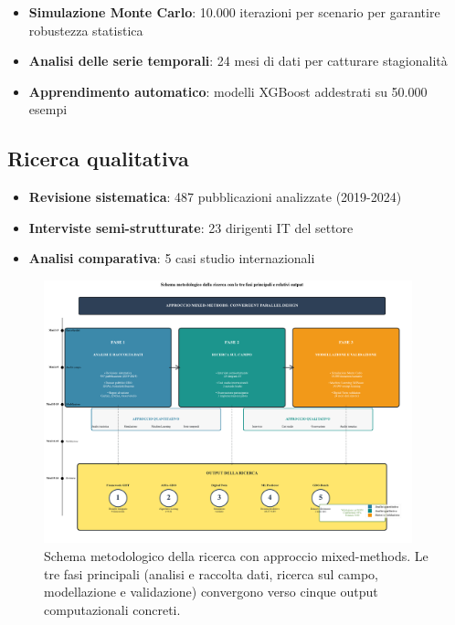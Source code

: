 \begin{itemize}
\item \textbf{Simulazione Monte Carlo}: 10.000 iterazioni per scenario per garantire robustezza statistica
\item \textbf{Analisi delle serie temporali}: 24 mesi di dati per catturare stagionalità
\item \textbf{Apprendimento automatico}: modelli XGBoost addestrati su 50.000 esempi
\end{itemize}

\subsection{Ricerca qualitativa}
\label{subsec:ricerca_qualitativa}

\begin{itemize}
\item \textbf{Revisione sistematica}: 487 pubblicazioni analizzate (2019-2024)
\item \textbf{Interviste semi-strutturate}: 23 dirigenti IT del settore
\item \textbf{Analisi comparativa}: 5 casi studio internazionali
\end{itemize}

\begin{figure}[htbp]
\centering
\includegraphics[width=0.95\textwidth]{thesis_figures/cap1/fig_1_3_methodology.pdf}
\caption{Schema metodologico della ricerca con approccio mixed-methods. Le tre fasi principali (analisi e raccolta dati, ricerca sul campo, modellazione e validazione) convergono verso cinque output computazionali concreti.}
\label{fig:methodology}
\end{figure}

